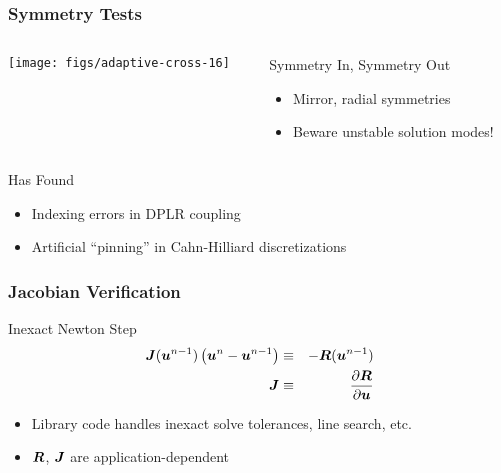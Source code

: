 \begin{frame}
\frametitle{Symmetry Tests}
\begin{columns}
\begin{column}{.4\textwidth}
\begin{center}
\texttt{[image: figs/adaptive-cross-16]}
\end{center}
\end{column}
\begin{column}{.6\textwidth}
\begin{block}{Symmetry In, Symmetry Out}
\begin{itemize}
\item Mirror, radial symmetries
\item Beware unstable solution modes!
\end{itemize}
\end{block}
\end{column}
\end{columns}

\pause

\begin{block}{Has Found}
\begin{itemize}
\item Indexing errors in DPLR coupling
\item Artificial ``pinning'' in Cahn-Hilliard discretizations
\end{itemize}
\end{block}
\end{frame}

\begin{frame}
\frametitle{Jacobian Verification}
\begin{block}{Inexact Newton Step}
\begin{eqnarray*}
{\boldsymbol{J}}({\boldsymbol{u}}^{n-1}) \left({\boldsymbol{u}}^n - {\boldsymbol{u}}^{n-1}\right) & \equiv &
-{\boldsymbol{R}}({\boldsymbol{u}}^{n-1}) \\
{\boldsymbol{J}} & \equiv & \frac{\partial {\boldsymbol{R}}}{\partial {\boldsymbol{u}}}
\end{eqnarray*}

\begin{itemize}
\item Library code handles inexact solve tolerances, line search,
etc.
\item ${\boldsymbol{R}}$, ${\boldsymbol{J}}$ are application-dependent
\end{itemize}
\end{block}
\end{frame}

